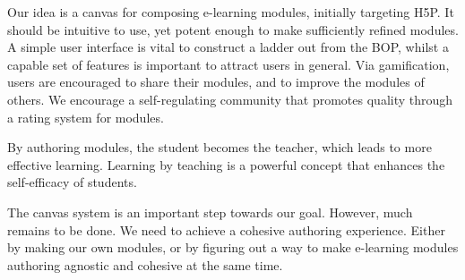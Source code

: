 Our idea is a canvas for composing e-learning modules, initially targeting 
H5P. It should be intuitive to use, yet potent enough to make sufficiently 
refined modules. A simple user interface is vital to construct a ladder out 
from the BOP, whilst a capable set of features is important to attract users 
in general. Via gamification, users are encouraged to share their modules, and 
to improve the modules of others. We encourage a self-regulating community 
that promotes quality through a rating system for modules.

By authoring modules, the student becomes the teacher, which leads to more 
effective learning. Learning by teaching is a powerful concept that enhances 
the self-efficacy of students.

The canvas system is an important step towards our goal. However, much remains 
to be done. We need to achieve a cohesive authoring experience. Either by 
making our own modules, or by figuring out a way to make e-learning modules 
authoring agnostic and cohesive at the same time.

